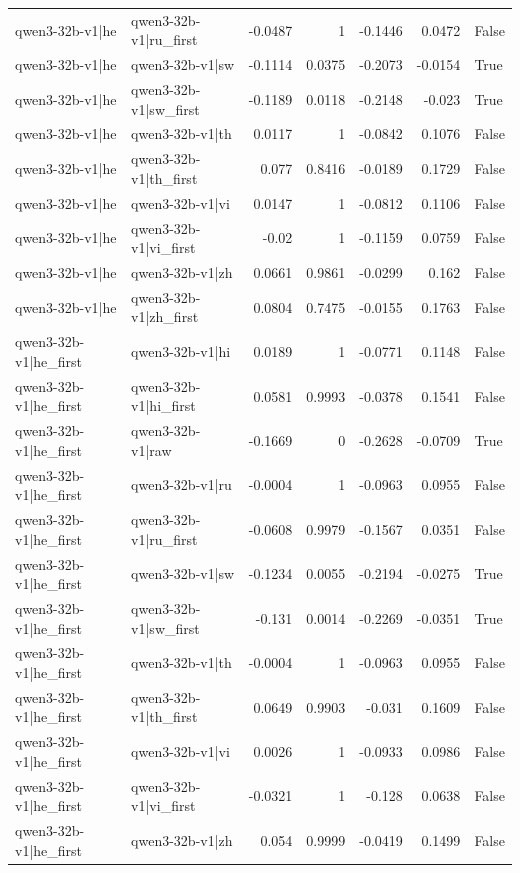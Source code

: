 \begin{table}
\begin{tabular}{l l r r r r l}
qwen3-32b-v1|he & qwen3-32b-v1|ru_first & -0.0487 & 1 & -0.1446 & 0.0472 & False \\
qwen3-32b-v1|he & qwen3-32b-v1|sw & -0.1114 & 0.0375 & -0.2073 & -0.0154 & True \\
qwen3-32b-v1|he & qwen3-32b-v1|sw_first & -0.1189 & 0.0118 & -0.2148 & -0.023 & True \\
qwen3-32b-v1|he & qwen3-32b-v1|th & 0.0117 & 1 & -0.0842 & 0.1076 & False \\
qwen3-32b-v1|he & qwen3-32b-v1|th_first & 0.077 & 0.8416 & -0.0189 & 0.1729 & False \\
qwen3-32b-v1|he & qwen3-32b-v1|vi & 0.0147 & 1 & -0.0812 & 0.1106 & False \\
qwen3-32b-v1|he & qwen3-32b-v1|vi_first & -0.02 & 1 & -0.1159 & 0.0759 & False \\
qwen3-32b-v1|he & qwen3-32b-v1|zh & 0.0661 & 0.9861 & -0.0299 & 0.162 & False \\
qwen3-32b-v1|he & qwen3-32b-v1|zh_first & 0.0804 & 0.7475 & -0.0155 & 0.1763 & False \\
qwen3-32b-v1|he_first & qwen3-32b-v1|hi & 0.0189 & 1 & -0.0771 & 0.1148 & False \\
qwen3-32b-v1|he_first & qwen3-32b-v1|hi_first & 0.0581 & 0.9993 & -0.0378 & 0.1541 & False \\
qwen3-32b-v1|he_first & qwen3-32b-v1|raw & -0.1669 & 0 & -0.2628 & -0.0709 & True \\
qwen3-32b-v1|he_first & qwen3-32b-v1|ru & -0.0004 & 1 & -0.0963 & 0.0955 & False \\
qwen3-32b-v1|he_first & qwen3-32b-v1|ru_first & -0.0608 & 0.9979 & -0.1567 & 0.0351 & False \\
qwen3-32b-v1|he_first & qwen3-32b-v1|sw & -0.1234 & 0.0055 & -0.2194 & -0.0275 & True \\
qwen3-32b-v1|he_first & qwen3-32b-v1|sw_first & -0.131 & 0.0014 & -0.2269 & -0.0351 & True \\
qwen3-32b-v1|he_first & qwen3-32b-v1|th & -0.0004 & 1 & -0.0963 & 0.0955 & False \\
qwen3-32b-v1|he_first & qwen3-32b-v1|th_first & 0.0649 & 0.9903 & -0.031 & 0.1609 & False \\
qwen3-32b-v1|he_first & qwen3-32b-v1|vi & 0.0026 & 1 & -0.0933 & 0.0986 & False \\
qwen3-32b-v1|he_first & qwen3-32b-v1|vi_first & -0.0321 & 1 & -0.128 & 0.0638 & False \\
qwen3-32b-v1|he_first & qwen3-32b-v1|zh & 0.054 & 0.9999 & -0.0419 & 0.1499 & False \\

\end{tabular}
\end{table}
